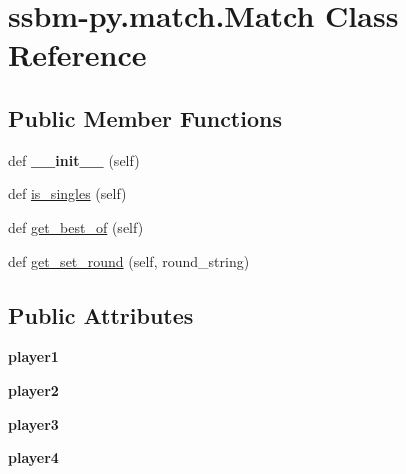 \hypertarget{classssbm-py_1_1match_1_1_match}{}\section{ssbm-\/py.match.\+Match Class Reference}
\label{classssbm-py_1_1match_1_1_match}
\subsection*{Public Member Functions}
\begin{DoxyCompactItemize}
\item 
\mbox{\label{classssbm-py_1_1match_1_1_match_af9976cfb563fc57b35f8fdde1485daa7}} 
def {\bfseries \+\_\+\+\_\+init\+\_\+\+\_\+} (self)
\item 
def \hyperlink{classssbm-py_1_1match_1_1_match_a437a1c291dc23588076add106dcb787b}{is\+\_\+singles} (self)
\item 
def \hyperlink{classssbm-py_1_1match_1_1_match_abc1ed5b3ce5ad859ce6f0efe4c53b0c4}{get\+\_\+best\+\_\+of} (self)
\item 
def \hyperlink{classssbm-py_1_1match_1_1_match_acfdd80d2f04e2d98050447d905ab368d}{get\+\_\+set\+\_\+round} (self, round\+\_\+string)
\end{DoxyCompactItemize}
\subsection*{Public Attributes}
\begin{DoxyCompactItemize}
\item 
\mbox{\label{classssbm-py_1_1match_1_1_match_a76110998a7c75fd7133f85b74493dcdc}} 
{\bfseries player1}
\item 
\mbox{\label{classssbm-py_1_1match_1_1_match_a77267977bea1a5aa2138040df876ad2e}} 
{\bfseries player2}
\item 
\mbox{\label{classssbm-py_1_1match_1_1_match_a90b2153f1fe1138fa6727a21ef3bb22d}} 
{\bfseries player3}
\item 
\mbox{\label{classssbm-py_1_1match_1_1_match_a8f045691af37d9b52eeaf2b314de60f0}} 
{\bfseries player4}
\end{DoxyCompactItemize}


